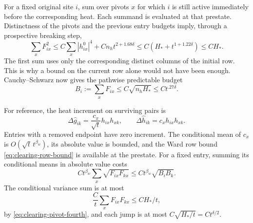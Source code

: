 For a fixed original site $i$, sum over pivots $x$ for which $i$ is still active
immediately before the corresponding heat.  Each summand is evaluated at that
prestate.  Distinctness of the pivots and the previous entry budgets imply,
through a prospective breaking step,
\begin{equation}\label{eq:clearing-pivot-fourth}
 \sum_x F_{ix}^2
 \le C\sum_x|h^0_{ix}|^4
       +Cn_h t^{2+1.68\delta}
 \le C(H_*+t^{1+1.22\delta})\le CH_*.
\end{equation}
The first sum uses only the corresponding distinct columns of the initial row.
This is why a bound on the current row alone would not have been enough.
Cauchy--Schwarz now gives the pathwise predictable budget
\begin{equation}\label{eq:clearing-pivot-mass}
 B_i:=\sum_x F_{ix}\le C\sqrt{n_hH_*}
       \le Ct^{.27\delta}.
\end{equation}

For reference, the heat increment on surviving pairs is
\begin{equation}\label{eq:clearing-entry-increment}
 \Delta\hat g_{ik}=\frac{c_x}{\sqrt t}h_{ix}h_{xk},
 \qquad \Delta\hat h_{ik}=c_x h_{ix}h_{xk}.
\end{equation}
Entries with a removed endpoint have zero increment.  The conditional mean of
$c_x$ is $O(\sqrt t\,t^{\beta_w})$, its absolute value is bounded, and the
Ward row bound \eqref{eq:clearing-row-bound} is available at the prestate.
For a fixed entry, summing its conditional means in absolute value costs
\[
 Ct^{\beta_w}\sum_x\sqrt{F_{ix}F_{kx}}
 \le Ct^{\beta_w}\sqrt{B_iB_k}.
\]
The conditional variance sum is at most
\[
 \frac Ct\sum_xF_{ix}F_{kx}\le CH_*/t,
\]
by \eqref{eq:clearing-pivot-fourth}, and each jump is at most
$C\sqrt{H_*/t}=Ct^{\delta/2}$.

